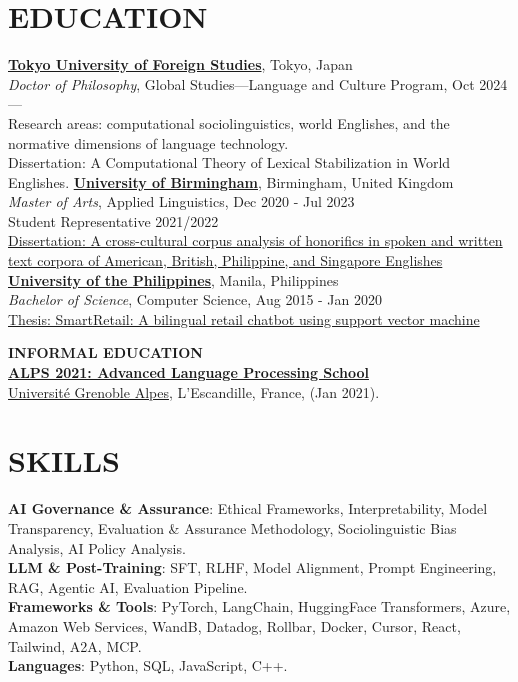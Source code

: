 \documentclass[margin]{res}
\begin{document}
\begin{resume}
\section{EDUCATION}
\href{https://www.tufs.ac.jp/english/}{\textbf{Tokyo University of Foreign Studies}}, Tokyo, Japan\\
{\sl Doctor of Philosophy}, Global Studies---Language and Culture Program, Oct 2024---\hfill\\
Research areas: computational sociolinguistics, world Englishes, and the normative dimensions of language technology.\\
Dissertation: A Computational Theory of Lexical Stabilization in World Englishes.
\vskip 0.01in
\href{https://www.birmingham.ac.uk/index.aspx}{\textbf{University of Birmingham}}, Birmingham, United Kingdom\\
{\sl Master of Arts}, Applied Linguistics, Dec 2020 - Jul 2023\hfill\\
Student Representative 2021/2022\\
\href{https://drive.google.com/file/d/1ngbks2IUxQhZs2TnTlXovnwnzyZ8HrUp/view?usp=sharing}{Dissertation: A cross-cultural corpus analysis of honorifics in spoken and written text corpora of American, British, Philippine, and Singapore Englishes}
\vskip 0.01in
\href{https://up.edu.ph/}{\textbf{University of the Philippines}}, Manila, Philippines\\
{\sl Bachelor of Science}, Computer Science, Aug 2015 - Jan 2020\hfill\\
\href{https://ieeexplore.ieee.org/document/9065208}{Thesis: SmartRetail: A bilingual retail chatbot using support vector machine}

\textbf{INFORMAL EDUCATION}\\
\href{http://alps-2021.imag.fr/}{\textbf{ALPS 2021: Advanced Language Processing School}}\\
\href{https://www.univ-grenoble-alpes.fr/}{Université Grenoble Alpes}, 
L'Escandille, France, (Jan 2021).

\section{SKILLS}
\textbf{AI Governance \& Assurance}: Ethical Frameworks, Interpretability, Model Transparency, Evaluation \& Assurance Methodology, Sociolinguistic Bias Analysis, AI Policy Analysis.\\
\textbf{LLM \& Post-Training}: SFT, RLHF, Model Alignment, Prompt Engineering, RAG, Agentic AI, Evaluation Pipeline.\\
\textbf{Frameworks \& Tools}: PyTorch, LangChain, HuggingFace Transformers, Azure, Amazon Web Services, WandB, Datadog, Rollbar, Docker, Cursor, React, Tailwind, A2A, MCP.\\
\textbf{Languages}: Python, SQL, JavaScript, C++.


\end{resume}
\end{document}
